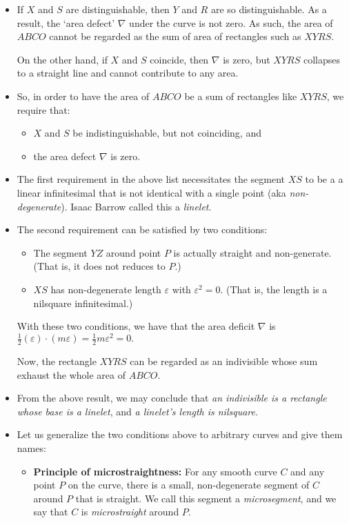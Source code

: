 \documentclass[10pt]{article}
\begin{document}
\begin{itemize}
  	\item If $X$ and $S$ are distinguishable, then $Y$ and $R$ are so distinguishable. As a result, the `area defect' $\nabla$ under the curve is not zero. As such, the area of $ABCO$ cannot be regarded as the sum of area of rectangles such as $XYRS$.

  	On the other hand, if $X$ and $S$ coincide, then $\nabla$ is zero, but $XYRS$ collapses to a straight line and cannot contribute to any area.

  	\item So, in order to have the area of $ABCO$ be a sum of rectangles like $XYRS$, we require that:
  	\begin{itemize}
  		\item $X$ and $S$ be indistinguishable, but not coinciding, and 
  		\item the area defect $\nabla$ is zero.
  	\end{itemize}

  	\item The first requirement in the above list necessitates the segment $XS$ to be a a linear infinitesimal that is not identical with a single point (aka \emph{non-degenerate}). Isaac Barrow called this a \emph{linelet}.

  	\item The second requirement can be satisfied by two conditions:
  	\begin{itemize}
  		\item The segment $YZ$ around point $P$ is actually straight and non-generate. (That is, it does not reduces to $P$.)

  		\item $XS$ has non-degenerate length $\varepsilon$ with $\varepsilon^2 = 0$. (That is, the length is a nilsquare infinitesimal.)
  	\end{itemize}

  	With these two conditions, we have that the area deficit $\nabla$ is $\frac{1}{2}(\varepsilon) \cdot (m\varepsilon) = \frac{1}{2} m \varepsilon^2 = 0.$

  	Now, the rectangle $XYRS$ can be regarded as an indivisible whose sum exhaust the whole area of $ABCO$.

  	\item From the above result, we may conclude that \emph{an indivisible is a rectangle whose base is a linelet}, and \emph{a linelet's length is nilsquare}.

  	\item Let us generalize the two conditions above to arbitrary curves and give them names:
  	\begin{itemize}
  		\item {\bf Principle of microstraightness:} For any smooth curve $C$ and any point $P$ on the curve, there is a small, non-degenerate segment of $C$ around $P$ that is straight. We call this segment a \emph{microsegment}, and we say that $C$ is \emph{microstraight} around $P$.


\end{itemize}
\end{itemize}
\end{document}
